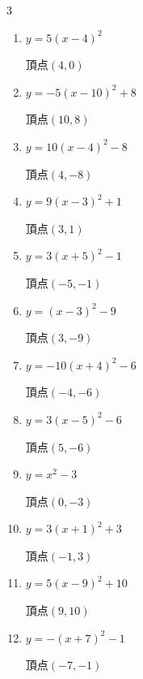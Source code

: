 \begin{multicols}{3}
\begin{enumerate}
  \item $\displaystyle y=5\left( x-4\right)^{2}$

        $\displaystyle 頂点\left( 4 , 0 \right)$

  \item $\displaystyle y=-5\left( x-10\right)^{2}+8$

        $\displaystyle 頂点\left( 10 , 8 \right)$

  \item $\displaystyle y=10\left( x-4\right)^{2}-8$

        $\displaystyle 頂点\left( 4 , -8 \right)$

  \item $\displaystyle y=9\left( x-3\right)^{2}+1$

        $\displaystyle 頂点\left( 3 , 1 \right)$

  \item $\displaystyle y=3\left( x+5\right)^{2}-1$

        $\displaystyle 頂点\left( -5 , -1 \right)$

  \item $\displaystyle y=\left( x-3\right)^{2}-9$

        $\displaystyle 頂点\left( 3 , -9 \right)$

  \item $\displaystyle y=-10\left( x+4\right)^{2}-6$

        $\displaystyle 頂点\left( -4 , -6 \right)$

  \item $\displaystyle y=3\left( x-5\right)^{2}-6$

        $\displaystyle 頂点\left( 5 , -6 \right)$

  \item $\displaystyle y=x^{2}-3$

        $\displaystyle 頂点\left( 0 , -3 \right)$

  \item $\displaystyle y=3\left( x+1\right)^{2}+3$

        $\displaystyle 頂点\left( -1 , 3 \right)$

  \item $\displaystyle y=5\left( x-9\right)^{2}+10$

        $\displaystyle 頂点\left( 9 , 10 \right)$

  \item $\displaystyle y=-\left( x+7\right)^{2}-1$

        $\displaystyle 頂点\left( -7 , -1 \right)$


\end{enumerate}
\end{multicols}
